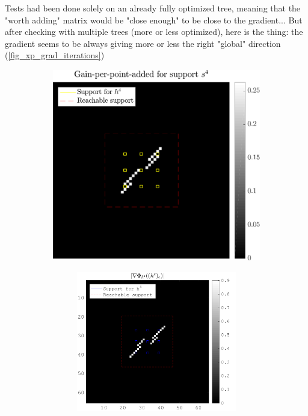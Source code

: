 Tests had been done solely on an already fully optimized tree, meaning that the "worth adding" matrix would be "close enough" to be close to the gradient...
But after checking with multiple trees (more or less optimized), here is the thing: the gradient seems to be always giving more or less the right "global" direction (\cref{fig_xp_grad_iterations})

\begin{figure}[!h]\centering
\begin{subfigure}[b]{0.49\textwidth}\centering
\includegraphics[width=\textwidth]{figures/xp_grad_iterations/xp_128x128_sc2_angl1_K3_S3_node4_objmatrix_bestvalues}
\end{subfigure}
\begin{subfigure}[b]{0.49\textwidth}\centering
	\begin{subfigure}[b]{0.49\textwidth}\centering
	\includegraphics[width=\textwidth]{figures/xp_grad_iterations/xp_128x128_sc2_angl1_K3_S3_node4_1thiteration_partgrad4_bestvalues}

\end{subfigure}
\end{subfigure}
\end{figure}
